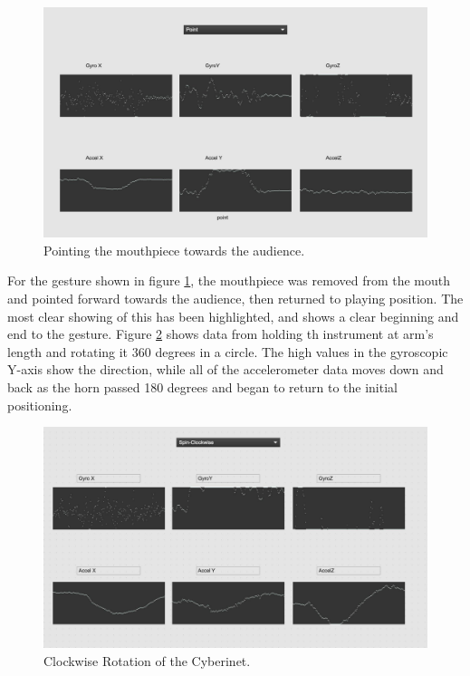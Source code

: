 \begin{figure}
    \centering
    \includegraphics[scale=0.2]{diagrams/gestureData/pointing.png}
    \caption{Pointing the mouthpiece towards the audience.}
    \label{fig:pointData}
\end{figure}

For the gesture shown in figure \ref{fig:pointData}, the mouthpiece was removed from the mouth and pointed forward towards the audience, then returned to playing position. The most clear showing of this has been highlighted, and shows a clear beginning and end to the gesture. Figure \ref{fig:clotRotate} shows data from holding th instrument at arm's length and rotating it 360 degrees in a circle. The high values in the gyroscopic Y-axis show the direction, while all of the accelerometer data moves down and back as the horn passed 180 degrees and began to return to the initial positioning.

\begin{figure}
    \centering
    \includegraphics[scale=0.2]{diagrams/gestureData/spin Clockwise.png}
    \caption{Clockwise Rotation of the Cyberinet.}
    \label{fig:clotRotate}
\end{figure}


